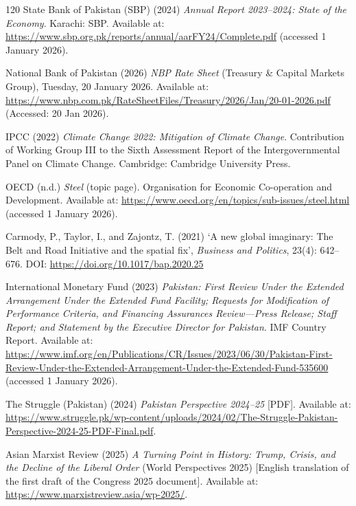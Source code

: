 \begin{singlespace}
\begin{thebibliography}{120}
State Bank of Pakistan (SBP) (2024) \emph{Annual Report 2023--2024: State of the Economy}.
Karachi: SBP. Available at: \url{https://www.sbp.org.pk/reports/annual/aarFY24/Complete.pdf} (accessed 1 January 2026).

National Bank of Pakistan (2026) \emph{NBP Rate Sheet} (Treasury \& Capital Markets Group),
Tuesday, 20 January 2026.
Available at: \url{https://www.nbp.com.pk/RateSheetFiles/Treasury/2026/Jan/20-01-2026.pdf}
(Accessed: 20 Jan 2026).


IPCC (2022) \emph{Climate Change 2022: Mitigation of Climate Change}.
Contribution of Working Group III to the Sixth Assessment Report of the Intergovernmental Panel on Climate Change.
Cambridge: Cambridge University Press.

OECD (n.d.) \emph{Steel} (topic page). Organisation for Economic Co-operation and Development.
Available at: \url{https://www.oecd.org/en/topics/sub-issues/steel.html} (accessed 1 January 2026).

Carmody, P., Taylor, I., and Zajontz, T. (2021) ‘A new global imaginary: The Belt and Road Initiative and the spatial fix’,
\emph{Business and Politics}, 23(4): 642--676. DOI: \url{https://doi.org/10.1017/bap.2020.25}

International Monetary Fund (2023) \emph{Pakistan: First Review Under the Extended Arrangement Under the Extended Fund Facility;
Requests for Modification of Performance Criteria, and Financing Assurances Review—Press Release; Staff Report; and Statement by the Executive Director for Pakistan}.
IMF Country Report.
Available at: \url{https://www.imf.org/en/Publications/CR/Issues/2023/06/30/Pakistan-First-Review-Under-the-Extended-Arrangement-Under-the-Extended-Fund-535600}
(accessed 1 January 2026).


The Struggle (Pakistan) (2024) \emph{Pakistan Perspective 2024--25} [PDF].
Available at: \url{https://www.struggle.pk/wp-content/uploads/2024/02/The-Struggle-Pakistan-Perspective-2024-25-PDF-Final.pdf}.

Asian Marxist Review (2025) \emph{A Turning Point in History: Trump, Crisis, and the Decline of the Liberal Order} (World Perspectives 2025) [English translation of the first draft of the Congress 2025 document].
Available at: \url{https://www.marxistreview.asia/wp-2025/}.

\end{thebibliography}

\end{singlespace}

